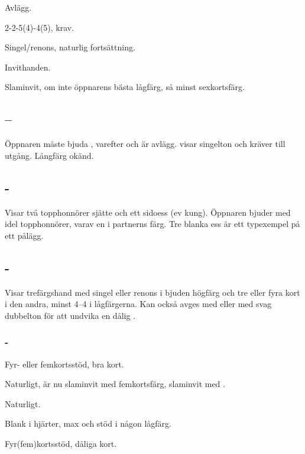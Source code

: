    \bbe
      \item[-pass] Avl\"agg.
      \item[-\ru{3}] 2-2-5(4)-4(5), krav.
      \item[-\ho{3}] Singel/renons, naturlig forts\"attning.
      \item[-\NT{3}] Invithanden.
      \item[-\la{4}] Slaminvit, om inte \"oppnarens b\"asta l{\aa}gf\"arg,
                    s{\aa} minst sexkortsf\"arg.
   \ebe

\subsection{--} 

Öppnaren måste bjuda , varefter \pass och  \"ar avl\"agg.
 visar singelton och kr\"aver till utg{\aa}ng. L{\aa}ngf\"arg ok\"and.

\subsection{ - }

Visar tv{\aa} topphonn\"orer sj\"atte och ett sidoess (ev kung). Öppnaren 
bjuder  med idel topphonn\"orer, varav en i partnerns f\"arg. Tre blanka
ess \"ar ett typexempel p{\aa} ett p{\aa}l\"agg.

\subsection{ - } 

Visar tref\"argshand med singel eller renons i bjuden h\"ogf\"arg och tre
eller fyra kort i den andra, minst 4--4 i lågfärgerna. Kan också avges med
 eller  med svag dubbelton för att
undvika en dålig .

\subsubsection{-}

\bbe
   \item[\spa{3}] Fyr- eller femkortsst\"od, bra kort.
   \item[\NT{3}] Naturligt,  \"ar nu slaminvit med femkortsf\"arg,
                   slaminvit med .
   \item[\la{4}] Naturligt.
   \item[\hj{4}] Blank i hj\"arter, max och st\"od i n{\aa}gon l{\aa}gf\"arg.
   \item[\spa{4}] Fyr(fem)kortsst\"od, d{\aa}liga kort.
\ebe

